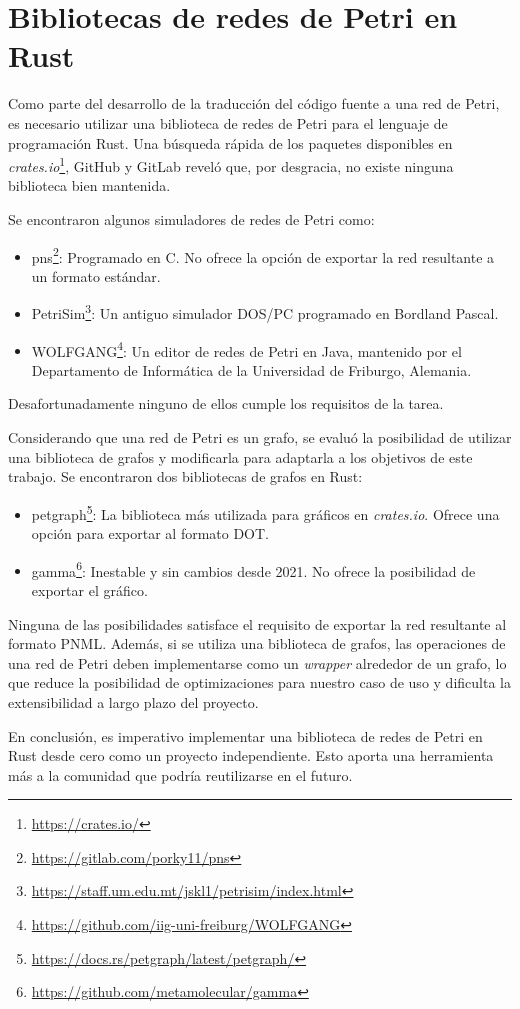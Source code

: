 \section{Bibliotecas de redes de Petri en Rust}

Como parte del desarrollo de la traducción del código fuente a una red de Petri, es necesario
utilizar una biblioteca de redes de Petri para el lenguaje de programación Rust. Una búsqueda
rápida de los paquetes disponibles en \emph{crates.io}\footnote{\url{https://crates.io/}},
GitHub y GitLab reveló que, por desgracia, no existe ninguna biblioteca bien mantenida.

Se encontraron algunos simuladores de redes de Petri como:

\begin{itemize}
      \item pns\footnote{\url{https://gitlab.com/porky11/pns}}:
            Programado en C. No ofrece la opción de exportar la red resultante a un formato
            estándar.
      \item PetriSim\footnote{\url{https://staff.um.edu.mt/jskl1/petrisim/index.html}}:
            Un antiguo simulador DOS/PC programado en Bordland Pascal.
      \item WOLFGANG\footnote{\url{https://github.com/iig-uni-freiburg/WOLFGANG}}:
            Un editor de redes de Petri en Java, mantenido por el Departamento de
            Informática de la Universidad de Friburgo, Alemania.
\end{itemize}

Desafortunadamente ninguno de ellos cumple los requisitos de la tarea.

Considerando que una red de Petri es un grafo, se evaluó la posibilidad de utilizar una biblioteca de
grafos y modificarla para adaptarla a los objetivos de este trabajo. Se encontraron dos
bibliotecas de grafos en Rust:

\begin{itemize}
      \item petgraph\footnote{\url{https://docs.rs/petgraph/latest/petgraph/}}:
            La biblioteca más utilizada para gráficos en \textit{crates.io}. Ofrece una opción para
            exportar al formato DOT.
      \item gamma\footnote{\url{https://github.com/metamolecular/gamma}}:
            Inestable y sin cambios desde 2021. No ofrece la posibilidad de exportar el gráfico.
\end{itemize}

Ninguna de las posibilidades satisface el requisito de exportar la red resultante al formato
\acrshort{PNML}. Además, si se utiliza una biblioteca de grafos, las operaciones de una red de Petri
deben implementarse como un \emph{wrapper} alrededor de un grafo, lo que reduce la posibilidad
de optimizaciones para nuestro caso de uso y dificulta la extensibilidad a largo plazo del
proyecto.

En conclusión, es imperativo implementar una biblioteca de redes de Petri en Rust desde cero
como un proyecto independiente. Esto aporta una herramienta más a la comunidad que podría
reutilizarse en el futuro.